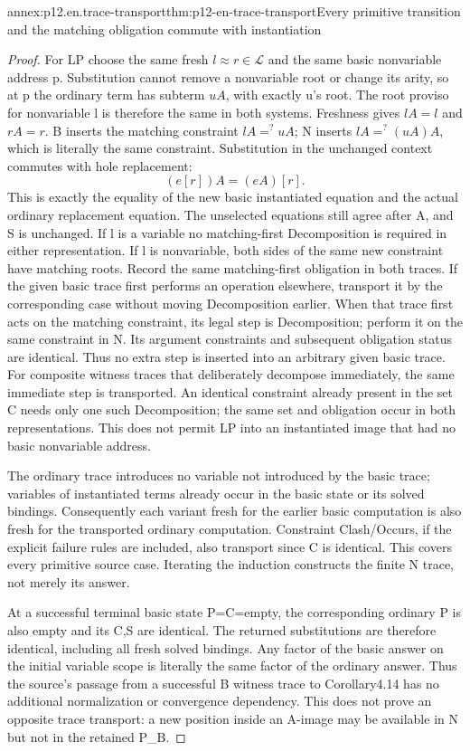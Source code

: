 \begin{annexitem}{annex:p12.en.trace-transport}{thm:p12-en-trace-transport}{Every primitive transition and the matching obligation commute with instantiation}
\begin{proof}
For LP choose the same fresh \(l\approx r\in\mathcal L\)
and the same basic nonvariable address p. Substitution cannot
remove a nonvariable root or change its arity, so at p the ordinary
term has subterm \(u A\), with exactly u's root. The root proviso
for nonvariable l is therefore the same in both systems. Freshness
gives \(l A=l\) and \(r A=r\). B inserts the matching constraint
\(l A=^{?}u A\); N inserts
\(l A=^{?}(u A)A\), which is literally the same constraint.
Substitution in the unchanged context commutes with hole replacement:
\[
                         (e[r])A=(e A)[r].
\]
This is exactly the equality of the new basic instantiated equation
and the actual ordinary replacement equation. The unselected equations
still agree after A, and S is unchanged. If l is a variable no
matching-first Decomposition is required in either representation.
If l is nonvariable, both sides of the same new constraint have
matching roots. Record the same matching-first obligation in both
traces. If the given basic trace first performs an operation elsewhere,
transport it by the corresponding case without moving Decomposition
earlier. When that trace first acts on the matching constraint, its
legal step is Decomposition; perform it on the same constraint in N.
Its argument constraints and subsequent obligation status are identical.
Thus no extra step is inserted into an arbitrary given basic trace.
For composite witness traces that deliberately decompose immediately,
the same immediate step is transported. An identical constraint already
present in the set C needs only one such Decomposition; the same
set and obligation occur in both representations. This does not
permit LP into an instantiated image that had no basic nonvariable
address.

The ordinary trace introduces no variable not introduced by the
basic trace; variables of instantiated terms already occur in the
basic state or its solved bindings. Consequently each variant fresh
for the earlier basic computation is also fresh for the transported
ordinary computation. Constraint Clash/Occurs, if the explicit
failure rules are included, also transport since C is identical.
This covers every primitive source case. Iterating the induction
constructs the finite N trace, not merely its answer.

At a successful terminal basic state P=C=empty, the corresponding
ordinary P is also empty and its C,S are identical. The returned
substitutions are therefore identical, including all fresh solved
bindings. Any factor of the basic answer on the initial variable
scope is literally the same factor of the ordinary answer. Thus the
source's passage from a successful B witness trace to Corollary4.14
has no additional normalization or convergence dependency. This
does not prove an opposite trace transport: a new position inside
an A-image may be available in N but not in the retained P_B.


\end{proof}
\end{annexitem}
